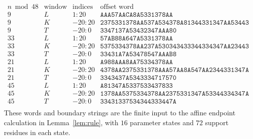 \[
\begin{array}{c|c|c|l}
n\bmod48&\text{window}&\text{indices}&\text{offset word}\\\hline
9&L&1:20&\mathtt{AAA57AACA8A5331378AA}\\
9&K&-20:20&\mathtt{2375331378AA537A534378A81344331347AA53443}\\
9&T&-20:0&\mathtt{3347137A53432347AAA80}\\
33&L&1:20&\mathtt{57AB88A647A5331378AA}\\
33&K&-20:20&\mathtt{5375334378AA237A530343433344334347AA23443}\\
33&T&-20:0&\mathtt{33431A7A53478547AAAB8}\\
21&L&1:20&\mathtt{A988AAA8AA75334378AA}\\
21&K&-20:20&\mathtt{4378AA2375331378AAA57AA8A547AA2344331347A}\\
21&T&-20:0&\mathtt{3343437A5343334717570}\\
45&L&1:20&\mathtt{A81347A5337533437833}\\
45&K&-20:20&\mathtt{1378AA5375334378AA2375331347A53344334347A}\\
45&T&-20:0&\mathtt{33431337534344333447A}\\
\end{array}
\]
These words and boundary strings are the finite input to the affine endpoint calculation in
Lemma~\ref{lem:rule}, with $16$ parameter states and $72$ support residues in each state.

